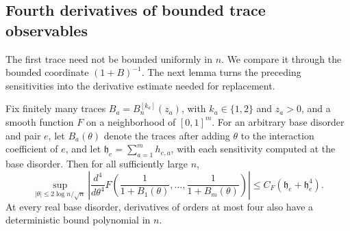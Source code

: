 \subsection{Fourth derivatives of bounded trace observables}

The first trace need not be bounded uniformly in $n$.  We compare it through
the bounded coordinate $(1+B)^{-1}$.  The next lemma turns the preceding
sensitivities into the derivative estimate needed for replacement.

\begin{lemma}\label{lem:comparison-derivative}
Fix finitely many traces $B_a=B_n^{[k_a]}(z_a)$, with $k_a\in\{1,2\}$ and
$z_a>0$, and a smooth function $F$ on a neighborhood of $[0,1]^m$.
For an arbitrary base disorder and pair $e$, let $B_a(\theta)$ denote the
traces after adding $\theta$ to the interaction coefficient of $e$, and let
$\mathfrak h_e=\sum_{a=1}^m h_{e,a}$, with each sensitivity computed at the
base disorder.  Then for all sufficiently large $n$,
\begin{equation}\label{eq:comparison-fourth-derivative}
 \sup_{|\theta|\le2\log n/\sqrt n}
 \left|\frac{d^4}{d\theta^4}
 F\left(\frac1{1+B_1(\theta)},\ldots,
        \frac1{1+B_m(\theta)}\right)\right|
 \le C_F(\mathfrak h_e+\mathfrak h_e^4).
\end{equation}
At every real base disorder, derivatives of orders at most four also have
a deterministic bound polynomial in $n$.
\end{lemma}

